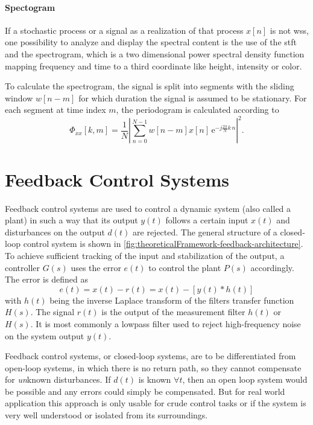 \paragraph{Spectogram}
If a stochastic process or a signal as a realization of that process $x[n]$ is not \gls{wss}, one possibility to analyze and display the spectral content is the use of the \gls{stft} and the spectrogram, which is a two dimensional power spectral density function mapping frequency and time to a third coordinate like height, intensity or color.

To calculate the spectrogram, the signal is split into segments with the sliding window $w[n-m]$ for which duration the signal is assumed to be stationary. For each segment at time index $m$, the periodogram is calculated according to
\begin{equation}
\hat{\Phi}_{xx}[k,m] = \frac{1}{N} \left| \sum_{n=0}^{N-1} w[n-m] x[n]\,\text{e}^{-j\frac{2\pi}{N}k\,n}\right|^2.
\end{equation}









\section{Feedback Control Systems}\label{sec:feedbackcontrol}
Feedback control systems are used to control a dynamic system (also called a plant) in such a way that its output $y(t)$ follows a certain input $x(t)$ and disturbances on the output $d(t)$ are rejected. The general structure of a closed-loop control system is shown in \autoref{fig:theoreticalFramework-feedback-architecture}. To achieve sufficient tracking of the input and stabilization of the output, a controller $G(s)$ uses the error $e(t)$ to control the plant $P(s)$ accordingly.
The error is defined as
\begin{equation}
e(t)=x(t)-r(t) = x(t)-[y(t)\ast h(t)]
\end{equation}
with $h(t)$ being the inverse Laplace transform of the filters transfer function $H(s)$. The signal $r(t)$ is the output of the measurement filter $h(t)$ or $H(s)$. It is most commonly a lowpass filter used to reject high-frequency noise on the system output $y(t)$.

Feedback control systems, or closed-loop systems, are to be differentiated from open-loop systems, in which there is no return path, so they cannot compensate for \textit{un}known disturbances. If $d(t)$ is known $\forall t$, then an open loop system would be possible and any errors could simply be compensated. But for real world application this approach is only usable for crude control tasks or if the system is very well understood or isolated from its surroundings.


